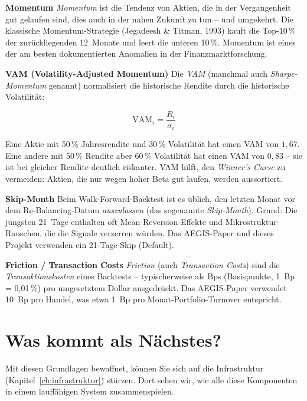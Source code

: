 \begin{definition}
\textbf{Momentum}
\emph{Momentum} ist die Tendenz von Aktien, die in der Vergangenheit
gut gelaufen sind, dies auch in der nahen Zukunft zu tun -- und
umgekehrt. Die klassische Momentum-Strategie (Jegadeesh \&
Titman, 1993) kauft die Top-10\,\% der zurückliegenden 12~Monate
und leert die unteren 10\,\%. Momentum ist eines der am besten
dokumentierten Anomalien in der Finanzmarktforschung.
\end{definition}

\begin{definition}
\textbf{VAM (Volatility-Adjusted Momentum)}
Die \emph{VAM} (manchmal auch \emph{Sharpe-Momentum} genannt)
normalisiert die historische Rendite durch die historische
Volatilität:

\[
  \text{VAM}_i = \frac{R_i}{\sigma_i}
\]

Eine Aktie mit 50\,\% Jahresrendite und 30\,\% Volatilität hat
einen VAM von $1{,}67$. Eine andere mit 50\,\% Rendite aber
60\,\% Volatilität hat einen VAM von $0{,}83$ -- sie ist bei
gleicher Rendite deutlich riskanter. VAM hilft, den
\emph{Winner's Curse} zu vermeiden: Aktien, die nur wegen hoher
Beta gut laufen, werden aussortiert.
\end{definition}

\begin{definition}
\textbf{Skip-Month}
Beim Walk-Forward-Backtest ist es üblich, den letzten Monat vor
dem Re-Balancing-Datum \emph{auszulassen} (das sogenannte
\emph{Skip-Month}). Grund: Die jüngsten 21~Tage enthalten oft
Mean-Reversion-Effekte und Mikrostruktur-Rauschen, die die
Signale verzerren würden. Das AEGIS-Paper und dieses Projekt
verwenden ein 21-Tage-Skip (Default).
\end{definition}

\begin{definition}
\textbf{Friction / Transaction Costs}
\emph{Friction} (auch \emph{Transaction Costs}) sind die
\emph{Transaktionskosten} eines Backtests -- typischerweise als
Bps (Basispunkte, 1~Bp = 0{,}01\,\%) pro umgesetztem Dollar
ausgedrückt. Das AEGIS-Paper verwendet 10~Bp pro Handel, was
etwa 1~Bp pro Monat-Portfolio-Turnover entspricht.
\end{definition}

\section{Was kommt als Nächstes?}

Mit diesen Grundlagen bewaffnet, können Sie sich auf die
Infrastruktur (Kapitel~\ref{ch:infrastruktur}) stürzen. Dort
sehen wir, wie alle diese Komponenten in einem lauffähigen
System zusammenspielen.
